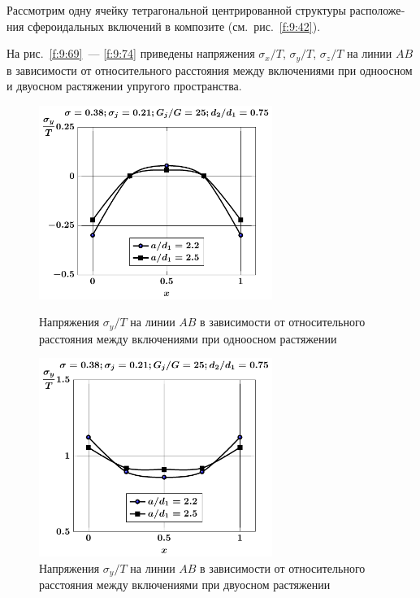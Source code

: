 \begin{russian}
Рассмотрим одну ячейку тетрагональной центрированной структуры расположения сфероидальных включений в композите (см.~рис.~\ref{f:9:42}).

На рис.~\ref{f:9:69}~--- \ref{f:9:74} приведены напряжения $\sigma_x/T$, $\sigma_y/T$, $\sigma_z/T$ на линии $AB$ в зависимости от относительного расстояния между включениями при одноосном и двуосном растяжении упругого пространства.

\begin{figure}[h!]
\centering\footnotesize
\parbox[b]{7.5cm}{\centering\includegraphics[width=7.6cm]{inc9-a-d75-g25-t1-sig_y.pdf}
\caption{Напряжения $\sigma_y/T$ на линии $AB$ в зависимости от относительного расстояния между включениями при одноосном растяжении
\label{f:9:71}}}\hfil\hfil
\parbox[b]{7.5cm}{\centering\includegraphics[width=7.6cm]{inc9-a-d75-g25-t2-sig_y.pdf}
\caption{Напряжения $\sigma_y/T$ на линии $AB$ в зависимости от относительного расстояния между включениями при двуосном растяжении
\label{f:9:72}}}
\end{figure}


\end{russian}
